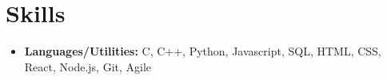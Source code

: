\documentclass[10.8pt, a4paper]{extarticle}
\newcommand{\shorterSection}[1]{\vspace{-10pt}\section{#1}}
\begin{document}

\shorterSection{Skills}
\vspace{-2pt}
\begin{itemize}
    \item \textbf{Languages/Utilities:} C, C++, Python, Javascript, SQL, HTML, CSS, React, Node.js, Git, Agile
\end{itemize}
\vspace{0.055cm}
\end{document}

